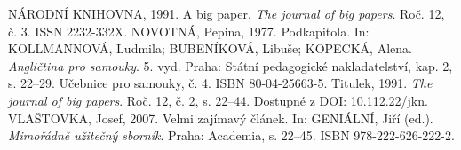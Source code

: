 \documentclass{article}
\begin{document}
\begin{thebibliography}{99}
  NÁRODNÍ KNIHOVNA, 1991. A big paper. \emph{The journal of big papers}. Roč. 12, č. 3. ISSN 2232-332X.
  NOVOTNÁ, Pepina, 1977. Podkapitola. In: KOLLMANNOVÁ, Ludmila; BUBENÍKOVÁ, Libuše; KOPECKÁ, Alena. \emph{Angličtina pro samouky}. 5. vyd. Praha: Státní pedagogické nakladatelství, kap. 2, s. 22--29. Učebnice pro samouky, č. 4. ISBN 80-04-25663-5.
  Titulek, 1991. \emph{The journal of big papers}. Roč. 12, č. 2, s. 22--44. Dostupné z DOI: 10.112.22/jkn. %
  VLAŠTOVKA, Josef, 2007. Velmi zajímavý článek. In: GENIÁLNÍ, Jiří (ed.). \emph{Mimořádně užitečný sborník}. Praha: Academia, s. 22--45. ISBN 978-222-626-222-2.

\end{thebibliography}
\end{document}

